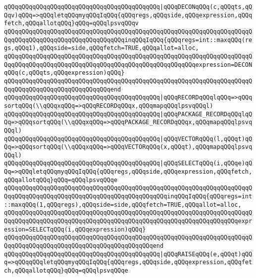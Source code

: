 \verb|qQQqqQQqqQQqqQQqqQQqqQQqqQQqqQQqqQQqqQQqqQQq|\verb#|qQQqDECONqQQq(c,qQQqts,qQQqv)qQQq=>qQQqletqQQqmyqQQqIqQQq{qQQqregs,qQQqside,qQQqexpression,qQQqfetch,qQQqallotqQQq}qQQq=qQQqlpsvqQQqv#\newline
\verb|qQQqqQQqqQQqqQQqqQQqqQQqqQQqqQQqqQQqqQQqqQQqqQQqqQQqqQQqqQQqqQQqqQQqqQQqqQQqqQQqqQQqqQQqqQQqqQQqqQQqqQQqinqQQqIqQQq{qQQqregs=int::maxqQQq(regs,qQQq1),qQQqside=side,qQQqfetch=TRUE,qQQqallot=alloc,|\newline
\verb|qQQqqQQqqQQqqQQqqQQqqQQqqQQqqQQqqQQqqQQqqQQqqQQqqQQqqQQqqQQqqQQqqQQqqQQqqQQqqQQqqQQqqQQqqQQqqQQqqQQqqQQqqQQqqQQqqQQqqQQqqQQqexpression=DECONqQQq(c,qQQqts,qQQqexpression)qQQq}|\newline
\verb|qQQqqQQqqQQqqQQqqQQqqQQqqQQqqQQqqQQqqQQqqQQqqQQqqQQqqQQqqQQqqQQqqQQqqQQqqQQqqQQqqQQqqQQqqQQqqQQqqQQqend|\newline
\verb|qQQqqQQqqQQqqQQqqQQqqQQqqQQqqQQqqQQqqQQqqQQq|\verb#|qQQqRECORDqQQqlqQQq=>qQQqsortqQQq(\\qQQqxqQQq=>qQQqRECORDqQQqx,qQQqmapqQQqlpsvqQQql)#\newline
\verb|qQQqqQQqqQQqqQQqqQQqqQQqqQQqqQQqqQQqqQQqqQQq|\verb#|qQQqPACKAGE_RECORDqQQqlqQQq=>qQQqsortqQQq(\\qQQqxqQQq=>qQQqPACKAGE_RECORDqQQqx,qQQqmapqQQqlpsvqQQql)#\newline
\verb|qQQqqQQqqQQqqQQqqQQqqQQqqQQqqQQqqQQqqQQqqQQq|\verb#|qQQqVECTORqQQq(l,qQQqt)qQQq=>qQQqsortqQQq(\\qQQqxqQQq=>qQQqVECTORqQQq(x,qQQqt),qQQqmapqQQqlpsvqQQql)#\newline
\verb|qQQqqQQqqQQqqQQqqQQqqQQqqQQqqQQqqQQqqQQqqQQq|\verb#|qQQqSELECTqQQq(i,qQQqe)qQQq=>qQQqletqQQqmyqQQqIqQQq{qQQqregs,qQQqside,qQQqexpression,qQQqfetch,qQQqallotqQQq}qQQq=qQQqlpsvqQQqe#\newline
\verb|qQQqqQQqqQQqqQQqqQQqqQQqqQQqqQQqqQQqqQQqqQQqqQQqqQQqqQQqqQQqqQQqqQQqqQQqqQQqqQQqqQQqqQQqqQQqqQQqqQQqqQQqqQQqqQQqqQQqinqQQqIqQQq{qQQqregs=int::maxqQQq(1,qQQqregs),qQQqside=side,qQQqfetch=TRUE,qQQqallot=alloc,|\newline
\verb|qQQqqQQqqQQqqQQqqQQqqQQqqQQqqQQqqQQqqQQqqQQqqQQqqQQqqQQqqQQqqQQqqQQqqQQqqQQqqQQqqQQqqQQqqQQqqQQqqQQqqQQqqQQqqQQqqQQqqQQqqQQqqQQqqQQqqQQqexpression=SELECTqQQq(i,qQQqexpression)qQQq}|\newline
\verb|qQQqqQQqqQQqqQQqqQQqqQQqqQQqqQQqqQQqqQQqqQQqqQQqqQQqqQQqqQQqqQQqqQQqqQQqqQQqqQQqqQQqqQQqqQQqqQQqqQQqqQQqqQQqqQQqend|\newline
\verb|qQQqqQQqqQQqqQQqqQQqqQQqqQQqqQQqqQQqqQQqqQQq|\verb#|qQQqRAISEqQQq(e,qQQqt)qQQq=>qQQqqQQqletqQQqmyqQQqIqQQq{qQQqregs,qQQqside,qQQqexpression,qQQqfetch,qQQqallotqQQq}qQQq=qQQqlpsvqQQqe#\newline
